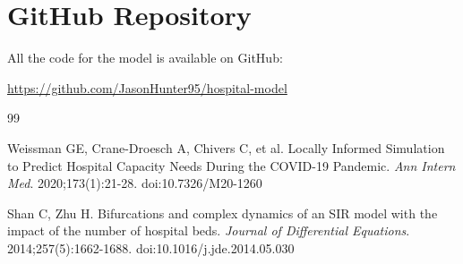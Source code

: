 \documentclass[10pt,twocolumn]{article}
\begin{document}
\section*{GitHub Repository}

All the code for the model is available on GitHub:

\begin{center}
\url{https://github.com/JasonHunter95/hospital-model}
\end{center}

\begin{thebibliography}{99}

Weissman GE, Crane-Droesch A, Chivers C, et al. Locally Informed Simulation to Predict Hospital Capacity Needs During the COVID-19 Pandemic. \textit{Ann Intern Med}. 2020;173(1):21-28. doi:10.7326/M20-1260

Shan C, Zhu H. Bifurcations and complex dynamics of an SIR model with the impact of the number of hospital beds. \textit{Journal of Differential Equations}. 2014;257(5):1662-1688. doi:10.1016/j.jde.2014.05.030

\end{thebibliography}
\end{document}
